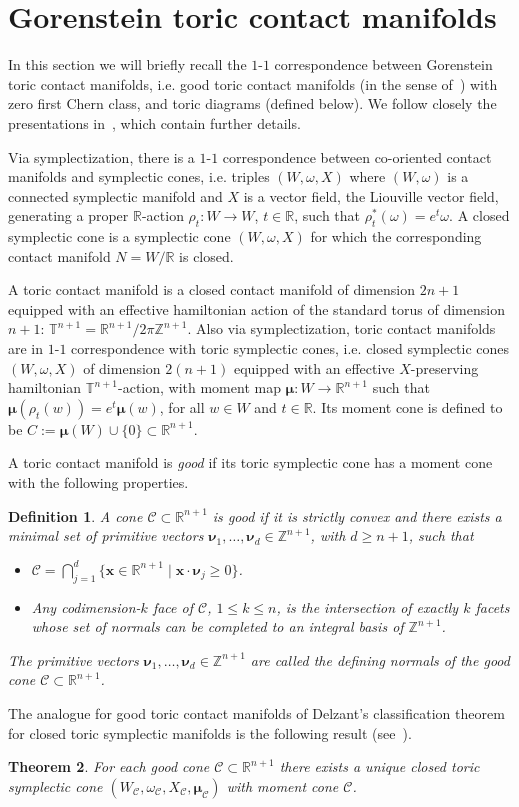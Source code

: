 \documentclass[a4paper,11pt,reqno]{amsart}
\newcommand{\R}{\mathbb R}
\newcommand{\Z}{\mathbb Z}
\newcommand{\T}{\mathbb T}
\newcommand{\Cc}{{\mathcal C}}
\newcommand{\om}{\omega}
\newtheorem{theorem}{Theorem}[section]
\newtheorem{definition}[theorem]{Definition}
\begin{document}
\section{Gorenstein toric contact manifolds}
\label{sec:Gorenstein}

In this section we will briefly recall the $1$-$1$ correspondence between Gorenstein toric 
contact manifolds, i.e. good toric contact manifolds (in the sense of~\cite{L}) with zero first 
Chern class, and toric diagrams (defined below). We follow closely the presentations in~\cite{AM, AMM}, 
which contain further details.

Via symplectization, there is a $1$-$1$ correspondence between co-oriented contact manifolds
and symplectic cones, i.e. triples $(W,\om,X)$ where $(W,\om)$ is a connected symplectic manifold
and $X$ is a vector field, the Liouville vector field, generating a proper $\R$-action
$\rho_t:W\to W$, $t\in\R$, such that $\rho_t^\ast (\om) = e^{t} \om$. A closed symplectic cone is a 
symplectic cone $(W,\om,X)$ for which the corresponding contact manifold $N = W/\R$ is closed.

A toric contact manifold is a closed contact manifold of dimension $2n+1$ equipped with an effective 
hamiltonian action of the standard torus of dimension $n+1$: $\T^{n+1} = \R^{n+1} / 2\pi\Z^{n+1}$. 
Also via symplectization, toric contact manifolds are in $1$-$1$ correspondence with toric symplectic cones, 
i.e. closed symplectic cones $(W,\om,X)$ of dimension $2(n+1)$ equipped with an effective $X$-preserving 
hamiltonian $\T^{n+1}$-action, with moment map $\bm{\mu} : W \to \R^{n+1}$ such that $\bm{\mu} (\rho_t (w)) = e^{t} \bm{\mu} (w)$, 
for all $w\in W$ and $t\in\R$. Its moment cone is defined to be $C:= \bm{\mu}(W) \cup \{ 0\} \subset \R^{n+1}$.

A toric contact manifold is {\it good} if its toric symplectic cone has a moment cone with the following properties.
\begin{definition} \label{def:good}
A cone $\Cc\subset\R^{n+1}$ is \emph{good} if it is strictly convex and there exists a minimal set 
of primitive vectors $\bm{\nu}_1, \ldots, \bm{\nu}_d \in \Z^{n+1}$, with 
$d\geq n+1$, such that
\begin{itemize}
\item[(i)] $\Cc = \bigcap_{j=1}^d \{\bm{x}\in\R^{n+1}\mid \bm{x}\cdot\bm{\nu}_j \geq 0\}$.
\item[(ii)] Any codimension-$k$ face of $\Cc$, $1\leq k\leq n$, is the intersection of exactly $k$ facets whose set of 
normals can be completed to an integral basis of $\Z^{n+1}$.
\end{itemize}
The primitive vectors $\bm{\nu}_1, \ldots, \bm{\nu}_d \in \Z^{n+1}$ are called the defining normals of the good cone $\Cc\subset\R^{n+1}$.
\end{definition}
The analogue for good toric contact manifolds of Delzant's classification theorem for closed toric
symplectic manifolds is the following result (see~\cite{L}).
\begin{theorem} \label{thm:good}
For each good cone $\Cc\subset\R^{n+1}$ there exists a unique closed toric symplectic cone
$(W_{\Cc}, \om_{\Cc}, X_{\Cc}, \bm{\mu}_{\Cc})$ with moment cone $\Cc$.
\end{theorem}
\end{document}
